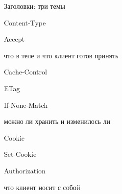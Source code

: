 \documentclass[aspectratio=169,10pt,t]{beamer}
\begin{document}
\begin{frame}{Заголовки: три темы}
  \slidetop

  \begin{minipage}[t]{0.31\textwidth}
    \par\vspace{0.6em}
    {\small\ttfamily Content-Type\par Accept\par}
    \vspace{0.6em}
    {\scriptsize\color{muted} что в теле и что клиент готов принять\par}
  \end{minipage}\hfill
  \begin{minipage}[t]{0.31\textwidth}
    \par\vspace{0.6em}
    {\small\ttfamily Cache-Control\par ETag\par If-None-Match\par}
    \vspace{0.6em}
    {\scriptsize\color{muted} можно ли хранить и изменилось ли\par}
  \end{minipage}\hfill
  \begin{minipage}[t]{0.31\textwidth}
    \par\vspace{0.6em}
    {\small\ttfamily Cookie\par Set-Cookie\par Authorization\par}
    \vspace{0.6em}
    {\scriptsize\color{muted} что клиент носит с собой\par}
  \end{minipage}

  \slidegap
\end{frame}
\end{document}
